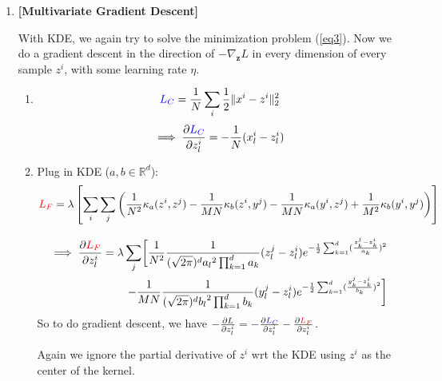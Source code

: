 \documentclass[11pt]{article}
\begin{document}
\begin{enumerate}
    \item {\bf [Multivariate Gradient Descent]}
    
    With KDE, we again try to solve the minimization problem (\ref{eq3}).
    Now we do a gradient descent in the direction of $-\nabla_{\mathbf{z}} L$ in every dimension of every sample $z^i$, with some learning rate $\eta$.
    
    \begin{enumerate}
        \item 
        $$
        \textcolor{blue}{L_C} = \frac{1}{N} \sum_i \frac{1}{2}\|x^i-z^i\|_2^2
        $$
        \begin{align*}
            \implies \frac{\partial \textcolor{blue}{L_C}}{\partial z^i_l}
            = - \frac{1}{N}(x^i_l-z^i_l)
        \end{align*}
        
        \item Plug in KDE ($a,b \in \mathbb{R}^d$):
        \begin{align*}
            \textcolor{red}{L_F}
            = \lambda \left[\sum_i \sum_j \left( 
            \frac{1}{N^2}\kappa_a(z^i,z^j) -  \frac{1}{MN}\kappa_b(z^i,y^j) -   \frac{1}{MN}\kappa_a(y^i,z^j) +  \frac{1}{M^2}\kappa_b(y^i,y^j)
            \right) \right]
        \end{align*}
        
        \begin{align*}
            \implies \frac{\partial \textcolor{red}{L_F}}{\partial z^i_l}
            = \lambda \sum_j \biggl[
             \frac{1}{N^2}\frac{1}{(\sqrt{2\pi})^d {a_l}^2 \prod_{k=1}^d a_k}  (z^j_l-z^i_l) e^{-\frac{1}{2} \sum_{k=1}^d (\frac{z^j_k-z^i_k}{a_k})^2} \\
             -  \frac{1}{MN}\frac{1}{(\sqrt{2\pi})^d {b_l}^2 \prod_{k=1}^d b_k} (y^j_l-z^i_l) e^{-\frac{1}{2} \sum_{k=1}^d (\frac{y^j_k-z^i_k}{b_k})^2} \biggr]
        \end{align*}
        So to do gradient descent, we have $-\frac{\partial L}{\partial z^i_l} = -  \frac{\partial \textcolor{blue}{L_C}}{\partial z^i_l} -  \frac{\partial \textcolor{red}{L_F}}{\partial z^i_l}$.
        
        Again we ignore the partial derivative of $z^i$ wrt the KDE using $z^i$ as the center of the kernel.
        \end{enumerate}
    
    
\end{enumerate}
\end{document}
